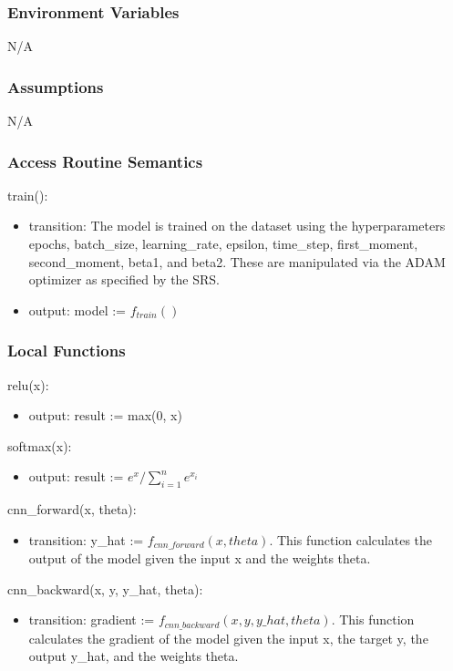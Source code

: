 \documentclass[12pt, titlepage]{article}
\begin{document}
\subsubsection{Environment Variables}

N/A

\subsubsection{Assumptions}

N/A

\subsubsection{Access Routine Semantics}

\noindent train():
\begin{itemize}
\item transition: The model is trained on the dataset using the hyperparameters
epochs, batch\_size, learning\_rate, epsilon, time\_step, first\_moment,
second\_moment, beta1, and beta2. These are manipulated via the ADAM optimizer
as specified by the SRS.
\item output: model := $f_{train}()$
\end{itemize}

\subsubsection{Local Functions}

\noindent relu(x):
\begin{itemize}
\item output: result := max(0, x)
\end{itemize}

\noindent softmax(x):
\begin{itemize}
\item output: result := $e^{x} / \sum_{i=1}^{n} e^{x_i}$
\end{itemize}

\noindent cnn\_forward(x, theta):
\begin{itemize}
\item transition: y\_hat := $f_{cnn\_forward}(x, theta)$. This function
calculates the output of the model given the input x and the weights theta.
\end{itemize}

\noindent cnn\_backward(x, y, y\_hat, theta):
\begin{itemize}
\item transition: gradient := $f_{cnn\_backward}(x, y, y\_hat, theta)$. This
function calculates the gradient of the model given the input x, the target y,
the output y\_hat, and the weights theta.
\end{itemize}
\end{document}
